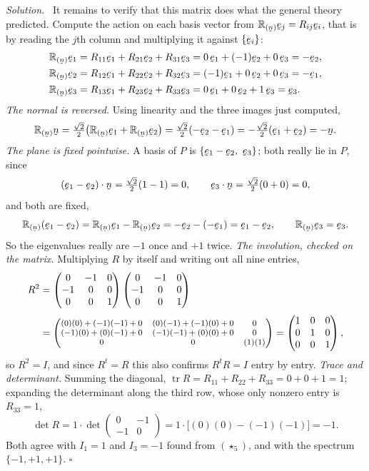 \documentclass[17pt,a4paper]{extreport}
\DeclareRobustCommand{\vek}[1]{\underaccent{\tilde}{#1}}
\newcommand{\Refl}[1]{\mathbb{R}_{(#1)}}
\newcommand{\tr}{\operatorname{tr}}
\newcommand{\be}{\vek{e}}
\newcommand{\bn}{\vek{n}}
\newcommand{\ip}[2]{#1\cdot#2}
\theoremstyle{scplain}
\theoremstyle{scdefn}
\theoremstyle{scplain}
\newenvironment{solution}
 {\par\smallskip\noindent\textit{Solution.}\ }
 {\hfill$\square$\par\medskip}
\begin{document}
\begin{solution}
It remains to verify that this matrix does what the general theory
predicted. Compute the action on each basis vector from
$\Refl{\bn}\be_j=R_{ij}\be_i$, that is by reading the $j$th column and
multiplying it against $\{\be_i\}$:
\[
\begin{aligned}
   \Refl{\bn}\be_1&=R_{11}\be_1+R_{21}\be_2+R_{31}\be_3
    =0\,\be_1+(-1)\be_2+0\,\be_3=-\be_2,\\
   \Refl{\bn}\be_2&=R_{12}\be_1+R_{22}\be_2+R_{32}\be_3
    =(-1)\be_1+0\,\be_2+0\,\be_3=-\be_1,\\
   \Refl{\bn}\be_3&=R_{13}\be_1+R_{23}\be_2+R_{33}\be_3
    =0\,\be_1+0\,\be_2+1\,\be_3=\be_3 .
\end{aligned}
\]
\emph{The normal is reversed.} Using linearity and the three images just
computed,
\[
   \Refl{\bn}\bn=\tfrac{\sqrt2}{2}\big(\Refl{\bn}\be_1+\Refl{\bn}\be_2\big)
   =\tfrac{\sqrt2}{2}(-\be_2-\be_1)
   =-\tfrac{\sqrt2}{2}(\be_1+\be_2)=-\bn .
\]
\emph{The plane is fixed pointwise.} A basis of $P$ is
$\{\be_1-\be_2,\ \be_3\}$; both really lie in $P$, since
\[
   \ip{(\be_1-\be_2)}{\bn}=\tfrac{\sqrt2}{2}(1-1)=0,\qquad
   \ip{\be_3}{\bn}=\tfrac{\sqrt2}{2}(0+0)=0,
\]
and both are fixed,
\[
   \Refl{\bn}(\be_1-\be_2)=\Refl{\bn}\be_1-\Refl{\bn}\be_2
   =-\be_2-(-\be_1)=\be_1-\be_2,\qquad
   \Refl{\bn}\be_3=\be_3 .
\]
So the eigenvalues really are $-1$ once and $+1$ twice.
\emph{The involution, checked on the matrix.} Multiplying $R$ by itself and
writing out all nine entries,
\[
\begin{aligned}
   R^{2}&=\begin{pmatrix}0&-1&0\\-1&0&0\\0&0&1\end{pmatrix}
         \begin{pmatrix}0&-1&0\\-1&0&0\\0&0&1\end{pmatrix}\\[1mm]
   &={\footnotesize\begin{pmatrix}
     (0)(0)+(-1)(-1)+0 & (0)(-1)+(-1)(0)+0 & 0\\
     (-1)(0)+(0)(-1)+0 & (-1)(-1)+(0)(0)+0 & 0\\
     0 & 0 & (1)(1)\end{pmatrix}}
   =\begin{pmatrix}1&0&0\\0&1&0\\0&0&1\end{pmatrix},
\end{aligned}
\]
so $R^{2}=I$, and since $R^{t}=R$ this also confirms $R^{t}R=I$ entry by
entry. \emph{Trace and determinant.} Summing the diagonal,
$\tr R=R_{11}+R_{22}+R_{33}=0+0+1=1$; expanding the determinant along the
third row, whose only nonzero entry is $R_{33}=1$,
\[
   \det R=1\cdot\det\begin{pmatrix}0&-1\\-1&0\end{pmatrix}
   =1\cdot\big[(0)(0)-(-1)(-1)\big]=-1 .
\]
Both agree with $I_1=1$ and $I_3=-1$ found from $(\star_5)$, and with the
spectrum $\{-1,+1,+1\}$.
\end{solution}
\end{document}
